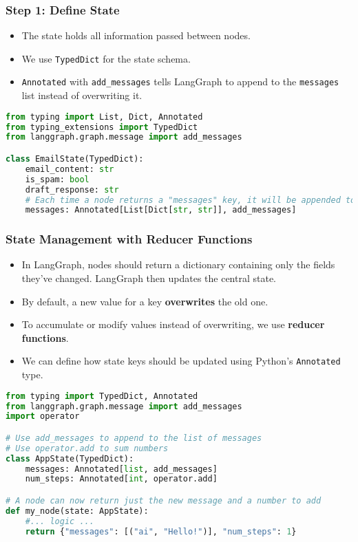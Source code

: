 \begin{frame}[fragile]\frametitle{Step 1: Define State}
      \begin{itemize}
        \item The state holds all information passed between nodes.
        \item We use \texttt{TypedDict} for the state schema.
        \item \texttt{Annotated} with \texttt{add\_messages} tells LangGraph to append to the \texttt{messages} list instead of overwriting it.
      \end{itemize}
\begin{lstlisting}[language=Python, basicstyle=\tiny]
from typing import List, Dict, Annotated
from typing_extensions import TypedDict
from langgraph.graph.message import add_messages

class EmailState(TypedDict):
    email_content: str
    is_spam: bool
    draft_response: str
    # Each time a node returns a "messages" key, it will be appended to this list
    messages: Annotated[List[Dict[str, str]], add_messages]
\end{lstlisting}
\end{frame}


      
	  
\begin{frame}[fragile]\frametitle{State Management with Reducer Functions}
      \begin{itemize}
        \item In LangGraph, nodes should return a dictionary containing only the fields they've changed. LangGraph then updates the central state.
        \item By default, a new value for a key \textbf{overwrites} the old one.
        \item To accumulate or modify values instead of overwriting, we use \textbf{reducer functions}.
        \item We can define how state keys should be updated using Python's \texttt{Annotated} type.
      \end{itemize}
\begin{lstlisting}[language=Python, basicstyle=\tiny]
from typing import TypedDict, Annotated
from langgraph.graph.message import add_messages
import operator

# Use add_messages to append to the list of messages
# Use operator.add to sum numbers
class AppState(TypedDict):
    messages: Annotated[list, add_messages]
    num_steps: Annotated[int, operator.add]

# A node can now return just the new message and a number to add
def my_node(state: AppState):
    #... logic ...
    return {"messages": [("ai", "Hello!")], "num_steps": 1}
\end{lstlisting}
\end{frame}


